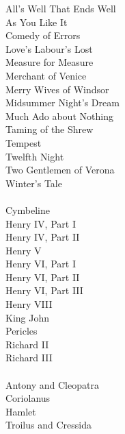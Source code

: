 \documentclass[11pt]{article}
\begin{document}
{All's Well That Ends Well\\
As You Like It\\
Comedy of Errors\\
Love's Labour's Lost\\
Measure for Measure\\
Merchant of Venice\\
Merry Wives of Windsor\\
Midsummer Night's Dream\\
Much Ado about Nothing\\
Taming of the Shrew\\
Tempest\\
Twelfth Night\\
Two Gentlemen of Verona\\
Winter's Tale\\
	\\
Cymbeline\\
Henry IV, Part I\\
Henry IV, Part II\\
Henry V\\
Henry VI, Part I\\
Henry VI, Part II\\
Henry VI, Part III\\
Henry VIII\\
King John\\
Pericles\\
Richard II\\
Richard III\\
	\\
Antony and Cleopatra\\
Coriolanus\\
Hamlet\\
Troilus and Cressida\\

}
\end{document}
